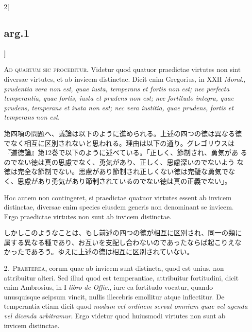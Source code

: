 \documentclass[paper=a4paper,fontsize=10pt,jafontsize=9pt,titlepage]{jlreq}
\begin{document}
\begin{paracol}{2}[\subsection{arg.1}]

{\scshape Ad quartum sic proceditur}. Videtur quod quatuor praedictae
virtutes non sint diversae virtutes, et ab invicem distinctae. Dicit
enim Gregorius, in XXII {\itshape Moral}., {\itshape prudentia vera
non est, quae iusta, temperans et fortis non est; nec perfecta
temperantia, quae fortis, iusta et prudens non est; nec fortitudo
integra, quae prudens, temperans et iusta non est; nec vera iustitia,
quae prudens, fortis et temperans non est}.

\switchcolumn

第四項の問題へ、議論は以下のように進められる。上述の四つの徳は異なる徳
でなく相互に区別されないと思われる。理由は以下の通り。グレゴリウスは
『道徳論』第12巻で以下のように述べている。「正しく、節制され、勇気があ
るのでない徳は真の思慮でなく、勇気があり、正しく、思慮深いのでないよう
な徳は完全な節制でない。思慮があり節制され正しくない徳は完璧な勇気でな
く、思慮があり勇気があり節制されているのでない徳は真の正義でない」。

\switchcolumn*

Hoc autem non contingeret,
si praedictae quatuor virtutes essent ab invicem distinctae, diversae
enim species eiusdem generis non denominant se invicem. Ergo
praedictae virtutes non sunt ab invicem distinctae.

\switchcolumn

しかしこのようなことは、もし前述の四つの徳が相互に区別され、同一の類に
属する異なる種であり、お互いを支配し合わないのであったならば起こりえな
かったであろう。ゆえに上述の徳は相互に区別されていない。


2.~{\scshape Praeterea}, eorum quae ab invicem sunt distincta, quod
est unius, non attribuitur alteri. Sed illud quod est temperantiae,
attribuitur fortitudini, dicit enim Ambrosius, in I {\itshape libro de
Offic}., iure ea fortitudo vocatur, quando unusquisque seipsum vincit,
nullis illecebris emollitur atque inflectitur. De temperantia etiam
dicit quod {\itshape modum vel ordinem servat omnium quae vel agenda
vel dicenda arbitramur}. Ergo videtur quod huiusmodi virtutes non sunt
ab invicem distinctae.


\end{paracol}
\end{document}
